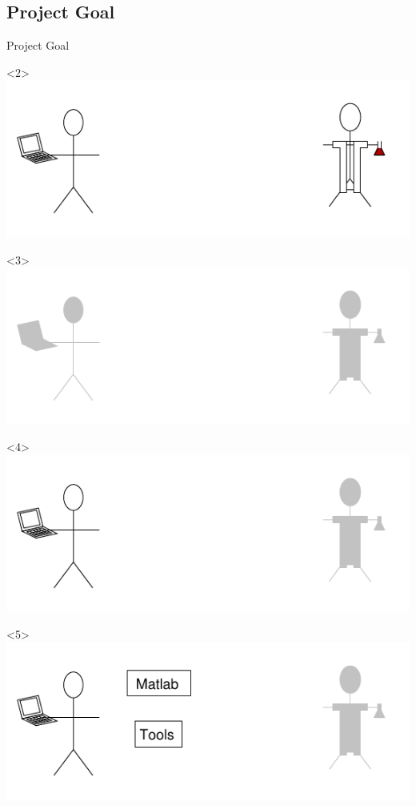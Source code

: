 \subsection*{Project Goal}
\begin{frame}{Project Goal}
    \begin{onlyenv}<2>
      \includegraphics{images/perspectives1.pdf}
    \end{onlyenv}
    \begin{onlyenv}<3>
      \includegraphics{images/perspectives_grey.pdf}
    \end{onlyenv}
    \begin{onlyenv}<4>
      \includegraphics{images/perspectives2_comp.pdf}
    \end{onlyenv}
    \begin{onlyenv}<5>
      \includegraphics{images/perspectives3_comp.pdf}

\end{onlyenv}
\end{frame}
